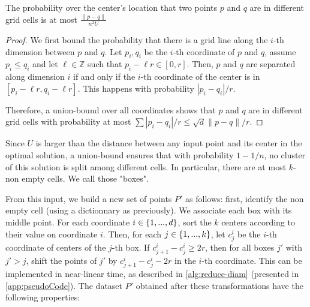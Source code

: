 \begin{lemma}\label{lem:quadtreeSep}
The probability over the center's location that two points $p$ and $q$ are in different grid cells is at most $\frac{\|p-q\|}{n^2 U}$
\end{lemma}
\begin{proof}
We first bound the probability that there is a grid line along the $i$-th dimension between $p$ and $q$. Let $p_i, q_i$ be the $i$-th coordinate of $p$ and $q$, assume $p_i \leq q_i$ and let $\ell \in \mathbb{Z}$ such that $p_i - \ell r \in [0, r]$. 
Then, $p$ and $q$ are separated along dimension $i$ if and only if the $i$-th coordinate of the center is in $[p_i - \ell r, q_i - \ell r]$. This happens with probability $|p_i - q_i|/r$. 

Therefore, a union-bound over all coordinates shows that $p$ and $q$ are in different grid cells with probability at most $\sum |p_i-q_i| / r \leq \sqrt{d} \|p-q\|/r$.
\end{proof}

Since $U$ is larger than the distance between any input point and its center in the optimal solution, a union-bound ensures that with probability $1-1/n$, no
cluster of this solution is split among different cells.  In particular, there are at most $k$-non empty cells. We call those "boxes".

From this input, we build a new set of points $P'$ as follows: first, identify the non empty cell (using a dictionnary as previously). We associate each box
with its middle point.  For each coordinate $i \in \left\{ 1, ..., d \right\}$, sort the $k$ centers according to their value on coordinate $i$. Then, for each $j
\in \left\{ 1, ..., k\right\}$, let $c^i_j$  be the $i$-th coordinate of centers of the $j$-th box. If $c^i_{j+1} - c^i_j \geq 2r$, then for all boxes $j'$ with $j'
> j$, shift the points of $j'$ by $c^i_{j+1} - c^i_j - 2r$ in the $i$-th coordinate. This can be implemented in near-linear time, as described in
\cref{alg:reduce-diam} (presented in \cref{app:pseudoCode}). The dataset $P'$ obtained after these transformations have the following properties:

